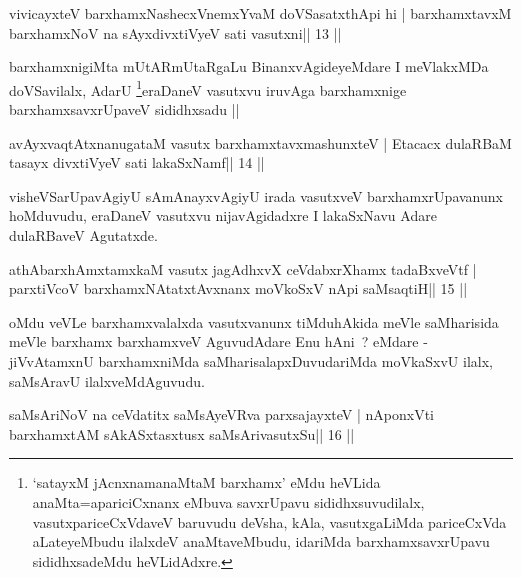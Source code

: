 
\begin{shl}
vivicayxteV barxhamxNashecxVnemxYvaM doVSasatxthA\s pi hi |
barxhamxtavxM barxhamxNoV na sAyxdivxtiVyeV sati vasutxni\hfill || 13 ||
\end{shl}

\begin{artha}
barxhamxnigiMta mUtARmUtaRgaLu BinanxvAgideyeMdare I meVlakxMDa
doVSavilalx, AdarU \footnote{`satayxM jAcnxnamanaMtaM barxhamx'
  eMdu heVLida anaMta=apariciCxnanx eMbuva savxrUpavu
  sididhxsuvudilalx, vasutxpariceCxVdaveV baruvudu deVsha, kAla,
  vasutxgaLiMda pariceCxVda aLateyeMbudu ilalxdeV anaMtaveMbudu,
  idariMda barxhamxsavxrUpavu sididhxsadeMdu heVLidAdxre.}eraDaneV 
  vasutxvu iruvAga barxhamxnige barxhamxsavxrUpaveV sididhxsadu ||
\end{artha}


\begin{shl}
avAyxvaqtAtxnanugataM vasutx barxhamxtavxmashunxteV |
Etacacx dulaRBaM tasayx divxtiVyeV sati lakaSxNamf\hfill || 14 ||
\end{shl}

\begin{artha}
visheVSarUpavAgiyU sAmAnayxvAgiyU irada vasutxveV barxhamxrUpavanunx hoMduvudu, eraDaneV vasutxvu nijavAgidadxre I lakaSxNavu Adare dulaRBaveV Agutatxde.
\end{artha}


\begin{shl}
athAbarxhAmxtamxkaM vasutx jagAdhxvX ceVdabxrXhamx tadaBxveVtf |
parxtiVcoV barxhamxNA\s tatxtAvxnanx moVkoSxV nApi saMsaqtiH\hfill || 15 ||
\end{shl}

\begin{artha}
oMdu veVLe barxhamxvalalxda vasutxvanunx tiMduhAkida meVle saMharisida meVle barxhamx barxhamxveV AguvudAdare Enu hAni~? eMdare - jiVvAtamxnU barxhamxniMda saMharisalapxDuvudariMda moVkaSxvU ilalx, saMsAravU ilalxveMdAguvudu.
\end{artha}

\begin{shl}
saMsAriNoV na ceVdatitx saMsAyeVRva parxsajayxteV |
nA\s ponxVti barxhamxtAM sAkASxtasxtusx saMsArivasutxSu\hfill || 16 ||
\end{shl}

